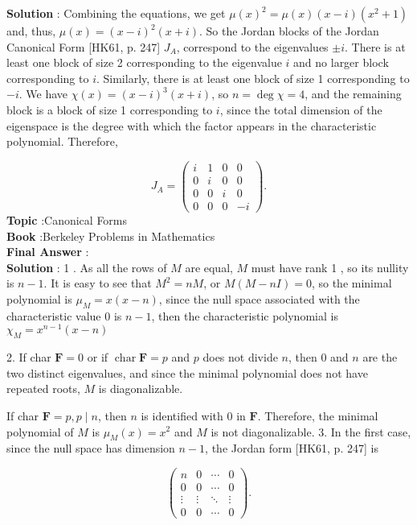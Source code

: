 \documentclass[10pt]{article}
\begin{document}
\textbf{Solution} : Combining the equations, we get $\mu(x)^{2}=\mu(x)(x-i)\left(x^{2}+1\right)$ and, thus, $\mu(x)=(x-i)^{2}(x+i)$. So the Jordan blocks of the Jordan Canonical Form [HK61, p. 247] $J_{A}$, correspond to the eigenvalues $\pm i$. There is at least one block of size 2 corresponding to the eigenvalue $i$ and no larger block corresponding to $i$. Similarly, there is at least one block of size 1 corresponding to $-i$. We have $\chi(x)=(x-i)^{3}(x+i)$, so $n=\operatorname{deg} \chi=4$, and the remaining block is a block of size 1 corresponding to $i$, since the total dimension of the eigenspace is the degree with which the factor appears in the characteristic polynomial. Therefore,

$$
J_{A}=\left(\begin{array}{cccc}
i & 1 & 0 & 0 \\
0 & i & 0 & 0 \\
0 & 0 & i & 0 \\
0 & 0 & 0 & -i
\end{array}\right) .
$$
\textbf{Topic} :Canonical Forms \\
\textbf{Book} :Berkeley Problems in Mathematics\\
\textbf{Final Answer} :\\


\textbf{Solution} : 1 . As all the rows of $M$ are equal, $M$ must have rank 1 , so its nullity is $n-1$. It is easy to see that $M^{2}=n M$, or $M(M-n I)=0$, so the minimal polynomial is $\mu_{M}=x(x-n)$, since the null space associated with the characteristic value 0 is $n-1$, then the characteristic polynomial is $\chi_{M}=x^{n-1}(x-n)$

2. If char $\mathbf{F}=0$ or if $\operatorname{char} \mathbf{F}=p$ and $p$ does not divide $n$, then 0 and $n$ are the two distinct eigenvalues, and since the minimal polynomial does not have repeated roots, $M$ is diagonalizable.

If char $\mathbf{F}=p, p \mid n$, then $n$ is identified with 0 in $\mathbf{F}$. Therefore, the minimal polynomial of $M$ is $\mu_{M}(x)=x^{2}$ and $M$ is not diagonalizable. 3. In the first case, since the null space has dimension $n-1$, the Jordan form [HK61, p. 247] is

$$
\left(\begin{array}{cccc}
n & 0 & \cdots & 0 \\
0 & 0 & \cdots & 0 \\
\vdots & \vdots & \ddots & \vdots \\
0 & 0 & \cdots & 0
\end{array}\right) .
$$
\end{document}
